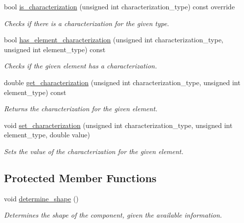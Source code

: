 \begin{DoxyCompactItemize}
bool \hyperlink{classcell__model_a96569fa865d6362be6e405ca34a46205}{is\+\_\+characterization} (unsigned int characterization\+\_\+type) const override
\begin{DoxyCompactList}\small\item\em Checks if there is a characterization for the given type. \end{DoxyCompactList}\item 
bool \hyperlink{classcell__model_aa157ea9e89fee28a46ffcca9ebf2304a}{has\+\_\+element\+\_\+characterization} (unsigned int characterization\+\_\+type, unsigned int element\+\_\+type) const
\begin{DoxyCompactList}\small\item\em Checks if the given element has a characterization. \end{DoxyCompactList}\item 
double \hyperlink{classcell__model_a538b317e7ed9feecb05c9714b935f4a1}{get\+\_\+characterization} (unsigned int characterization\+\_\+type, unsigned int element\+\_\+type) const
\begin{DoxyCompactList}\small\item\em Returns the characterization for the given element. \end{DoxyCompactList}\item 
void \hyperlink{classcell__model_ad53bf535f932bfa0d1c18ee043ac28bb}{set\+\_\+characterization} (unsigned int characterization\+\_\+type, unsigned int element\+\_\+type, double value)
\begin{DoxyCompactList}\small\item\em Sets the value of the characterization for the given element. \end{DoxyCompactList}\end{DoxyCompactItemize}
\subsection*{Protected Member Functions}
\begin{DoxyCompactItemize}
\item 
void \hyperlink{classcell__model_aab9cb5e9e92455f55515db7b4ca47e8b}{determine\+\_\+shape} ()
\begin{DoxyCompactList}\small\item\em Determines the shape of the component, given the available information. \end{DoxyCompactList}\end{DoxyCompactItemize}
